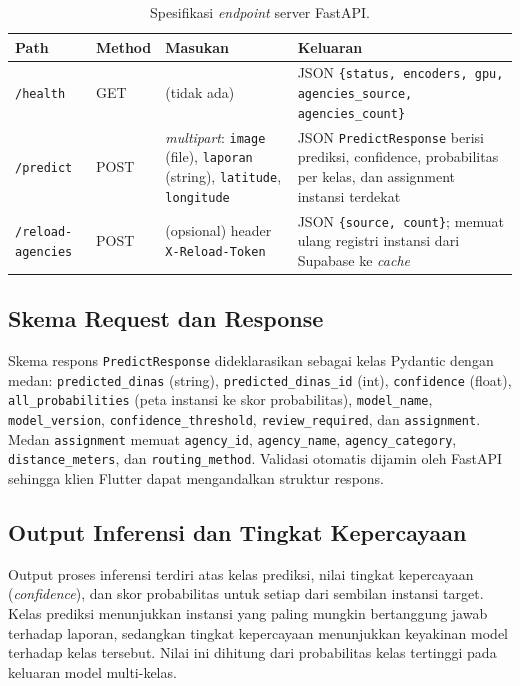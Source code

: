 \begin{table}[htbp]
\centering
\caption{Spesifikasi \textit{endpoint} server FastAPI.}
\label{tab:endpoints}
\begin{tabular}{p{1.7cm} p{2.0cm} p{4cm} p{4.7cm}}
\toprule
\textbf{Path} & \textbf{Method} & \textbf{Masukan} & \textbf{Keluaran} \\
\midrule
\texttt{/health} & GET & (tidak ada) & JSON \texttt{\{status, encoders, gpu, agencies\_source, agencies\_count\}} \\
\texttt{/predict} & POST & \textit{multipart}: \texttt{image} (file), \texttt{laporan} (string), \texttt{latitude}, \texttt{longitude} & JSON \texttt{PredictResponse} berisi prediksi, confidence, probabilitas per kelas, dan assignment instansi terdekat \\
\texttt{/reload-agencies} & POST & (opsional) header \texttt{X-Reload-Token} & JSON \texttt{\{source, count\}}; memuat ulang registri instansi dari Supabase ke \textit{cache} \\
\bottomrule
\end{tabular}
\end{table}

\subsection{Skema Request dan Response}

Skema respons \texttt{PredictResponse} dideklarasikan sebagai kelas Pydantic dengan medan: \texttt{predicted\_dinas} (string), \texttt{predicted\_dinas\_id} (int), \texttt{confidence} (float), \texttt{all\_probabilities} (peta instansi ke skor probabilitas), \texttt{model\_name}, \texttt{model\_version}, \texttt{confidence\_threshold}, \texttt{review\_required}, dan \texttt{assignment}. Medan \texttt{assignment} memuat \texttt{agency\_id}, \texttt{agency\_name}, \texttt{agency\_category}, \texttt{distance\_meters}, dan \texttt{routing\_method}. Validasi otomatis dijamin oleh FastAPI sehingga klien Flutter dapat mengandalkan struktur respons.

\subsection{Output Inferensi dan Tingkat Kepercayaan}

Output proses inferensi terdiri atas kelas prediksi, nilai tingkat kepercayaan (\textit{confidence}), dan skor probabilitas untuk setiap dari sembilan instansi target. Kelas prediksi menunjukkan instansi yang paling mungkin bertanggung jawab terhadap laporan, sedangkan tingkat kepercayaan menunjukkan keyakinan model terhadap kelas tersebut. Nilai ini dihitung dari probabilitas kelas tertinggi pada keluaran model multi-kelas.

